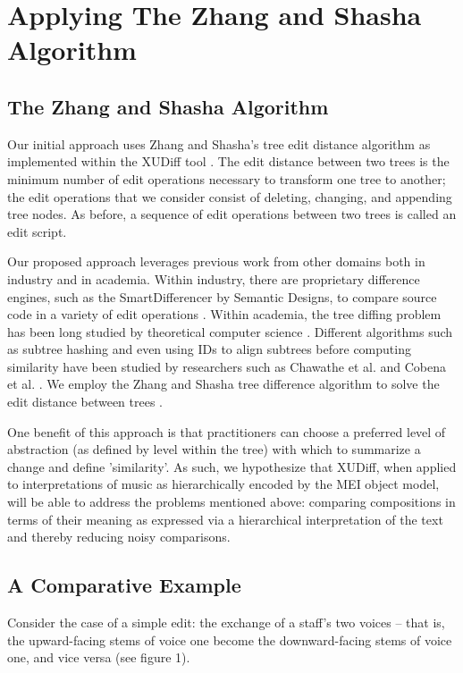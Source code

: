 \documentclass{article}
\begin{document}
\section{Applying The Zhang and Shasha Algorithm}
\subsection{The Zhang and Shasha Algorithm}
Our initial approach uses Zhang and Shasha's tree edit distance
algorithm as implemented within the XUDiff tool \cite{Weaver:2013sl}.  The edit distance
between two trees is the minimum number of edit operations necessary
to transform one tree to another; the edit operations that we
consider consist of deleting, changing, and appending tree nodes. As
before, a sequence of edit operations between two trees is called an
edit script.

Our proposed approach leverages previous work from other domains both in
industry and in academia.  Within industry, there are proprietary
difference engines, such as the SmartDifferencer by Semantic Designs,
to compare source code in a variety of edit operations \cite{Designs:qm}.  Within
academia, the tree diffing problem has been long studied by
theoretical computer science \cite{Bille:2005ec}.  Different algorithms such as
subtree hashing and even using IDs to align subtrees before computing
similarity have been studied by researchers such as Chawathe et
al. and Cobena et al. \cite{Chawathe:1996jb,Cobena:2002gd}.  We employ the Zhang and Shasha tree
difference algorithm to solve the edit distance between trees \cite{Zhang:1989ec,Zhang:1989il}.

One benefit of this approach is that practitioners can choose a preferred level of abstraction (as defined by level within the tree) with
which to summarize a change and define 'similarity'.  As such, we
hypothesize that XUDiff, when applied to interpretations of music as
hierarchically encoded by the MEI object model, will be able to
address the problems mentioned above: comparing compositions in terms
of their meaning as expressed via a hierarchical interpretation of the
text and thereby reducing noisy comparisons.

 

\subsection{A Comparative Example}
Consider the case of a simple edit: the exchange of a staff's two voices -- that is, the upward-facing stems of voice one become the downward-facing stems of voice one, and vice versa (see figure 1). 
\end{document}
